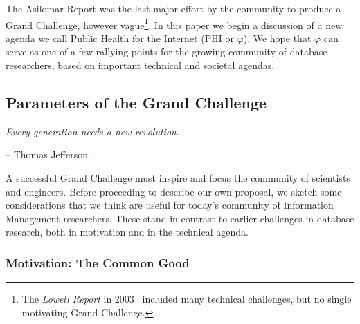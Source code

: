\documentclass{acm_proc_article-sp}
\def\philogo{{\large $\varphi$}\xspace}
\begin{document}
The Asilomar Report was the last major effort by the community to produce a Grand Challenge, however vague\footnote{The {\em Lowell Report} in 2003~\cite{lowell} included many technical challenges, but no single motivating Grand Challenge.}. In this paper we begin a discussion of a new agenda we call Public Health for the Internet (PHI or \philogo). We hope that \philogo can serve as one of a few rallying points for the growing community of database researchers, based on important technical and societal agendas.

\pagebreak 
\subsection{Parameters of the Grand Challenge}

% 
% 
{\em Every generation needs a new revolution.}

\vspace{-12pt}-- Thomas Jefferson.

A successful Grand Challenge must inspire and focus the community of scientists and engineers. Before proceeding to describe our own proposal, we sketch some considerations that we think are useful for today's community of Information Management researchers. These stand in contrast to earlier challenges in database research, both in motivation and in the technical agenda.

\subsubsection{Motivation: The Common Good}
\end{document}
